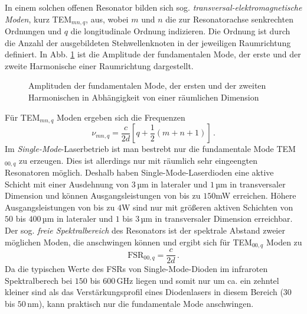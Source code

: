 In einem solchen offenen Resonator bilden sich sog.
\textit{transversal-elektromagnetische Moden}, kurz TEM$_{mn,q}$, aus, wobei $m$
und $n$ die zur Resonatorachse senkrechten Ordnungen und $q$ die longitudinale
Ordnung indizieren. Die Ordnung ist durch die Anzahl der ausgebildeten
Stehwellenknoten in der jeweiligen Raumrichtung definiert. In
Abb. \ref{fig:TEM-moden} ist die Amplitude der fundamentalen Mode, der erste und
der zweite Harmonische einer Raumrichtung dargestellt.
\begin{figure}[h]
	\centering
	\footnotesize
	
	\caption[räumliche Moden im Resonator]{Amplituden der fundamentalen Mode, der
	ersten und der zweiten Harmonischen in Abhängigkeit von einer
	räumlichen Dimension}\label{fig:TEM-moden}
\end{figure}
Für TEM$_{mn,q}$ Moden ergeben sich die Frequenzen
\begin{equation}\label{eq:TEM-moden_frequenz}
	\nu_{mn,q}=\frac{c}{2d}\left[q+\frac{1}{2}(m+n+1)\right]\,.
\end{equation}
Im \textit{Single-Mode}-Laserbetrieb ist man bestrebt nur die fundamentale Mode
TEM$_{00,q}$ zu erzeugen. Dies ist allerdings nur mit räumlich sehr eingeengten
Resonatoren möglich. Deshalb haben Single-Mode-Laserdioden eine aktive
Schicht mit einer Ausdehnung von $3\,$µm in lateraler und $1\,$µm in
transversaler Dimension und können Ausgangsleistungen von bis zu $150$mW erreichen. Höhere
Ausgangsleistungen von bis zu $4$W sind nur mit größeren aktiven Schichten von
$50$ bis $400\,$µm in lateraler und $1$ bis $3\,$µm in transversaler Dimension
erreichbar.
Der sog. \textit{freie Spektralbereich} des Resonators ist der spektrale Abstand
zweier möglichen Moden, die anschwingen können und ergibt sich für TEM$_{00,q}$
Moden zu
\begin{equation}\label{eq:FSR_TEM-moden}
	\text{FSR}_{00,q}=\frac{c}{2d}\,.
\end{equation}
Da die typischen Werte des FSRs von Single-Mode-Dioden im infraroten
Spektralberech bei $150$ bis $600\,$GHz liegen und somit nur um ca. ein zehntel
kleiner sind als das Verstärkungsprofil eines Diodenlasers in diesem Bereich
($30$ bis $50\,$nm), kann praktisch nur die fundamentale Mode anschwingen.

